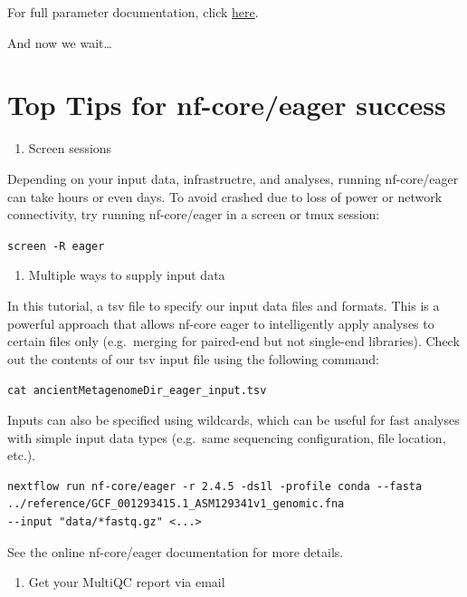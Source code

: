 \documentclass[
  letterpaper,
]{book}
\providecommand{\tightlist}{%
  \setlength{\itemsep}{0pt}\setlength{\parskip}{0pt}}\usepackage{longtable,booktabs,array}
\begin{document}
For full parameter documentation, click
\href{https://nf-co.re/eager/2.4.5/parameters}{here}.

And now we wait\ldots{}

\hypertarget{top-tips-for-nf-coreeager-success}{%
\section{Top Tips for nf-core/eager
success}\label{top-tips-for-nf-coreeager-success}}

\begin{enumerate}
\def\labelenumi{\arabic{enumi}.}
\tightlist
\item
  Screen sessions
\end{enumerate}

Depending on your input data, infrastructre, and analyses, running
nf-core/eager can take hours or even days. To avoid crashed due to loss
of power or network connectivity, try running nf-core/eager in a screen
or tmux session:

\texttt{screen\ -R\ eager}

\begin{enumerate}
\def\labelenumi{\arabic{enumi}.}
\setcounter{enumi}{1}
\tightlist
\item
  Multiple ways to supply input data
\end{enumerate}

In this tutorial, a tsv file to specify our input data files and
formats. This is a powerful approach that allows nf-core eager to
intelligently apply analyses to certain files only (e.g.~merging for
paired-end but not single-end libraries). Check out the contents of our
tsv input file using the following command:

\texttt{cat\ ancientMetagenomeDir\_eager\_input.tsv}

Inputs can also be specified using wildcards, which can be useful for
fast analyses with simple input data types (e.g.~same sequencing
configuration, file location, etc.).

\begin{verbatim}
nextflow run nf-core/eager -r 2.4.5 -ds1l -profile conda --fasta ../reference/GCF_001293415.1_ASM129341v1_genomic.fna
--input "data/*fastq.gz" <...>
\end{verbatim}

See the online nf-core/eager documentation for more details.

\begin{enumerate}
\def\labelenumi{\arabic{enumi}.}
\setcounter{enumi}{2}
\tightlist
\item
  Get your MultiQC report via email
\end{enumerate}
\end{document}

